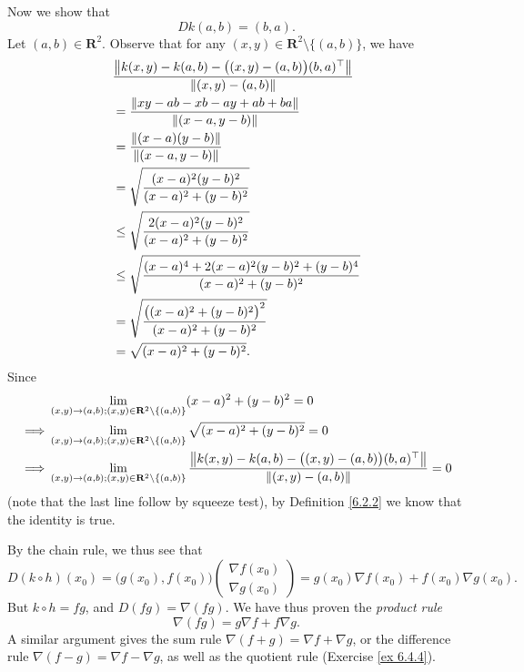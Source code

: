 \begin{example}
    Now we show that
    \[
        D k(a, b) = (b, a).
    \]
    Let \((a, b) \in \mathbf{R}^2\).
    Observe that for any \((x, y) \in \mathbf{R}^2 \setminus \{(a, b)\}\), we have
    \begin{align*}
         & \frac{\norm*{k(x, y) - k(a, b) - \big((x, y) - (a, b)\big) (b, a)^\top}}{\norm*{(x, y) - (a, b)}} \\
         & = \frac{\norm*{xy - ab - xb - ay + ab + ba}}{\norm*{(x - a, y - b)}}                              \\
         & = \frac{\norm*{(x - a)(y - b)}}{\norm*{(x - a, y - b)}}                                           \\
         & = \sqrt{\frac{(x - a)^2 (y - b)^2}{(x - a)^2 + (y - b)^2}}                                        \\
         & \leq \sqrt{\frac{2 (x - a)^2 (y - b)^2}{(x - a)^2 + (y - b)^2}}                                   \\
         & \leq \sqrt{\frac{(x - a)^4 + 2 (x - a)^2 (y - b)^2 + (y - b)^4}{(x - a)^2 + (y - b)^2}}           \\
         & = \sqrt{\frac{\big((x - a)^2 + (y - b)^2\big)^2}{(x - a)^2 + (y - b)^2}}                          \\
         & = \sqrt{(x - a)^2 + (y - b)^2}.
    \end{align*}
    Since
    \begin{align*}
                 & \lim_{(x, y) \to (a, b) ; (x, y) \in \mathbf{R}^2 \setminus \{(a, b)\}} (x - a)^2 + (y - b)^2 = 0                                                                             \\
        \implies & \lim_{(x, y) \to (a, b) ; (x, y) \in \mathbf{R}^2 \setminus \{(a, b)\}} \sqrt{(x - a)^2 + (y - b)^2} = 0                                                                      \\
        \implies & \lim_{(x, y) \to (a, b) ; (x, y) \in \mathbf{R}^2 \setminus \{(a, b)\}} \frac{\norm*{k(x, y) - k(a, b) - \big((x, y) - (a, b)\big) (b, a)^\top}}{\norm*{(x, y) - (a, b)}} = 0
    \end{align*}
    (note that the last line follow by squeeze test),
    by Definition \ref{6.2.2} we know that the identity is true.

    By the chain rule, we thus see that
    \[
        D (k \circ h)(x_0) = \big(g(x_0), f(x_0)\big) \begin{pmatrix}
            \nabla f(x_0) \\
            \nabla g(x_0)
        \end{pmatrix} = g(x_0) \nabla f(x_0) + f(x_0) \nabla g(x_0).
    \]
    But \(k \circ h = fg\), and \(D (fg) = \nabla (fg)\).
    We have thus proven the \emph{product rule}
    \[
        \nabla (fg) = g \nabla f + f \nabla g.
    \]
    A similar argument gives the sum rule \(\nabla (f + g) = \nabla f + \nabla g\), or the difference rule \(\nabla (f - g) = \nabla f - \nabla g\), as well as the quotient rule (Exercise \ref{ex 6.4.4}).
\end{example}

